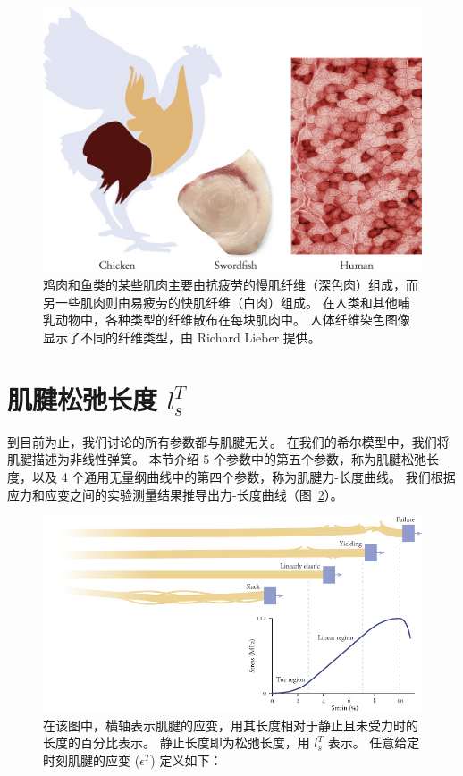\begin{figure}[!htb]
	\centering
	\includegraphics[width=0.8\linewidth]{chap5/5_6}
	\caption{鸡肉和鱼类的某些肌肉主要由抗疲劳的慢肌纤维（深色肉）组成，而另一些肌肉则由易疲劳的快肌纤维（白肉）组成。
		在人类和其他哺乳动物中，各种类型的纤维散布在每块肌肉中。
		人体纤维染色图像显示了不同的纤维类型，由 Richard Lieber 提供。 \label{fig:5_6}}
\end{figure}


\section{肌腱松弛长度 $l_s^T$}

到目前为止，我们讨论的所有参数都与肌腱无关。
在我们的希尔模型中，我们将肌腱描述为非线性弹簧。
本节介绍 5 个参数中的第五个参数，称为肌腱松弛长度，以及 4 个通用无量纲曲线中的第四个参数，称为肌腱力-长度曲线。
我们根据应力和应变之间的实验测量结果推导出力-长度曲线（图~\ref{fig:5_7}）。


\begin{figure}[!htb]
	\centering
	\includegraphics[width=0.8\linewidth]{chap5/5_7}
	\caption{在该图中，横轴表示肌腱的应变，用其长度相对于静止且未受力时的长度的百分比表示。
		静止长度即为松弛长度，用 $l_s^T$ 表示。
		任意给定时刻肌腱的应变 ($\epsilon^T$) 定义如下： \label{fig:5_7}}
\end{figure}

